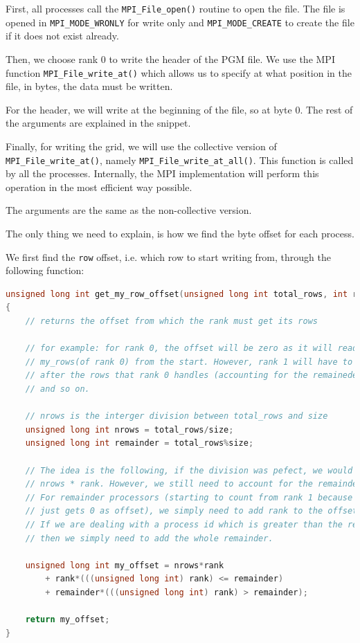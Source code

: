 \documentclass{report}
\begin{document}
First, all processes call the \texttt{MPI\_File\_open()} routine to open the file. 
The file is opened in \texttt{MPI\_MODE\_WRONLY} for write only and 
\texttt{MPI\_MODE\_CREATE} to create the file if it does not exist already.

Then, we choose rank 0 to write the header of the PGM file. We use the MPI function
\texttt{MPI\_File\_write\_at()} which allows us to specify at what position in the 
file, in bytes, the data must be written. 

For the header, we will write at the beginning of the file, so at byte 0. The 
rest of the arguments are explained in the snippet.

Finally, for writing the grid, we will use the collective version of 
\texttt{MPI\_File\_write\_at()}, namely \texttt{MPI\_File\_write\_at\_all()}. 
This function is called by all the processes. Internally, the MPI 
implementation will perform this operation in the most efficient way possible.

The arguments are the same as the non-collective version. 

The only thing we need to explain, is how we find the byte offset for each 
process. 

We first find the \texttt{row} offset, i.e. which row to start writing from, 
through the following function:

\begin{lstlisting}[language=C++]
unsigned long int get_my_row_offset(unsigned long int total_rows, int rank, int size)
{
    // returns the offset from which the rank must get its rows 

    // for example: for rank 0, the offset will be zero as it will read 
    // my_rows(of rank 0) from the start. However, rank 1 will have to read 
    // after the rows that rank 0 handles (accounting for the remaineder), 
    // and so on.

    // nrows is the interger division between total_rows and size
    unsigned long int nrows = total_rows/size;
    unsigned long int remainder = total_rows%size;

    // The idea is the following, if the division was pefect, we would do 
    // nrows * rank. However, we still need to account for the remainder.
    // For remainder processors (starting to count from rank 1 because rank 0 
    // just gets 0 as offset), we simply need to add rank to the offset. 
    // If we are dealing with a process id which is greater than the remainder, 
    // then we simply need to add the whole remainder.
    
    unsigned long int my_offset = nrows*rank
        + rank*(((unsigned long int) rank) <= remainder) 
        + remainder*(((unsigned long int) rank) > remainder);

    return my_offset;
}
\end{lstlisting}
\end{document}

